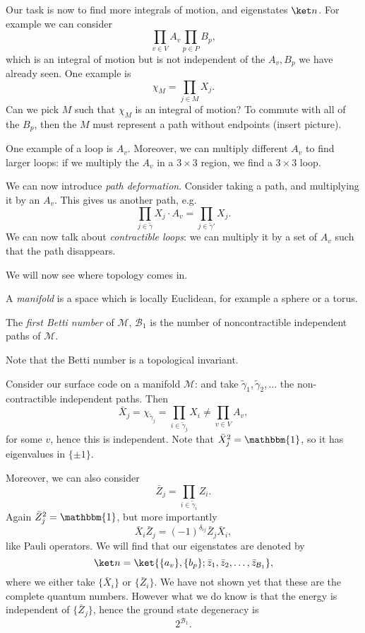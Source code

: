 \documentclass[12pt]{article}
\begin{document}
Our task is now to find more integrals of motion, and eigenstates $\ket n$. For example we can consider
\[
\prod_{v \in V} A_v \prod_{p \in P}B_p,
\]
which is an integral of motion but is not independent of the $A_v, B_p$ we have already seen. One example is
\[
\chi_M = \prod_{j \in M} X_j.
\]
Can we pick $M$ such that $\chi_M$ is an integral of motion? To commute with all of the $B_p$, then the $M$ must represent a path without endpoints (insert picture).

One example of a loop is $A_v$. Moreover, we can multiply different $A_v$ to find larger loops: if we multiply the $A_v$ in a $3 \times 3$ region, we find a $3 \times 3$ loop.

We can now introduce \emph{path deformation}. Consider taking a path, and multiplying it by an $A_v$. This gives us another path, e.g.
\[
\prod_{j \in \tilde \gamma} X_j \cdot A_v = \prod_{j \in \tilde \gamma'} X_j.
\]
We can now talk about \emph{contractible loops}: we can multiply it by a set of $A_v$ such that the path disappears.

We will now see where topology comes in.


\begin{definition}
	A \emph{manifold} is a space which is locally Euclidean, for example a sphere or a torus.

	The \emph{first Betti number} of $\mathcal M$, $\mathcal{B}_1$ is the number of noncontractible independent paths of $\mathcal{M}$.
\end{definition}
Note that the Betti number is a topological invariant.

Consider our surface code on a manifold $\mathcal{M}$: and take $\tilde \gamma_1, \tilde \gamma_2, \ldots$ the non-contractible independent paths. Then
\[
\bar X_j = \chi_{\tilde \gamma_j}= \prod_{i \in \tilde \gamma_j} X_i \neq \prod_{v \in V} A_v,
\]
for some $v$, hence this is independent. Note that $\bar X_j^2 = \mathbbm{1}$, so it has eigenvalues in $\{\pm 1\}$.

Moreover, we can also consider
\[
\bar Z_j = \prod_{i \in \tilde \gamma_i} Z_i.
\]
Again $\bar Z_j^2 = \mathbbm{1}$, but more importantly
\[
\bar X_i \bar Z_j = (-1)^{\delta_{ij}} \bar Z_j \bar X_i,
\]
like Pauli operators. We will find that our eigenstates are denoted by
\[
	\ket n = \ket{\{a_v\}, \{b_p\}; \bar z_1, \bar z_2, \ldots, \bar z_{\mathcal{B}_1}},
\]
where we either take $\{\bar X_i\}$ or $\{\bar Z_i\}$. We have not shown yet that these are the complete quantum numbers. However what we do know is that the energy is independent of $\{\bar Z_j\}$, hence the ground state degeneracy is
\[
2^{\mathcal{B}_1}.
\]
\end{document}
